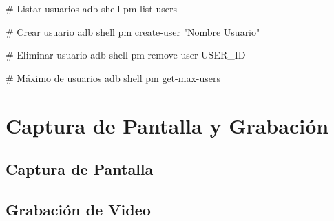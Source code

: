 \documentclass[
  doc,
  floatsintext,
  longtable,
  a4paper,
  nolmodern,
  notxfonts,
  notimes,
  12pt,
  colorlinks=true,linkcolor=blue,citecolor=blue,urlcolor=blue]{apa7}
\newenvironment{Shaded}{\begin{snugshade}}{\end{snugshade}}
\newcommand{\AttributeTok}[1]{\textcolor[rgb]{0.40,0.45,0.13}{#1}}
\newcommand{\CommentTok}[1]{\textcolor[rgb]{0.37,0.37,0.37}{#1}}
\newcommand{\ExtensionTok}[1]{\textcolor[rgb]{0.00,0.23,0.31}{#1}}
\newcommand{\FunctionTok}[1]{\textcolor[rgb]{0.28,0.35,0.67}{#1}}
\newcommand{\NormalTok}[1]{\textcolor[rgb]{0.00,0.23,0.31}{#1}}
\newcommand{\OperatorTok}[1]{\textcolor[rgb]{0.37,0.37,0.37}{#1}}
\newcommand{\StringTok}[1]{\textcolor[rgb]{0.13,0.47,0.30}{#1}}
\newcommand{\VariableTok}[1]{\textcolor[rgb]{0.07,0.07,0.07}{#1}}
\begin{document}
\begin{Shaded}
\begin{Highlighting}[]
\CommentTok{\# Listar usuarios}
\ExtensionTok{adb}\NormalTok{ shell pm list users}

\CommentTok{\# Crear usuario}
\ExtensionTok{adb}\NormalTok{ shell pm create{-}user }\StringTok{"Nombre Usuario"}

\CommentTok{\# Eliminar usuario}
\ExtensionTok{adb}\NormalTok{ shell pm remove{-}user USER\_ID}

\CommentTok{\# Máximo de usuarios}
\ExtensionTok{adb}\NormalTok{ shell pm get{-}max{-}users}
\end{Highlighting}
\end{Shaded}

\section{Captura de Pantalla y
Grabación}\label{captura-de-pantalla-y-grabaciuxf3n}

\subsection{Captura de Pantalla}\label{captura-de-pantalla}

\begin{Shaded}
\end{Shaded}

\subsection{Grabación de Video}\label{grabaciuxf3n-de-video}
\end{document}
